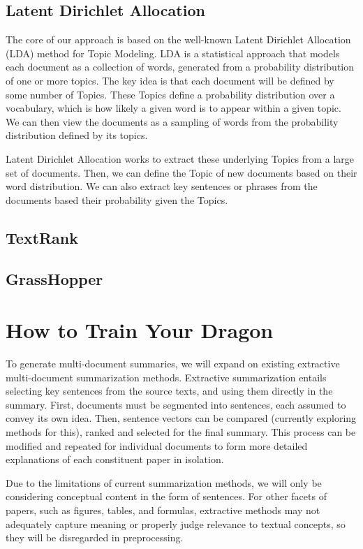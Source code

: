 \documentclass[conference]{sig-alternate-05-2015}
\begin{document}
\subsection{Latent Dirichlet Allocation}
The core of our approach is based on the well-known Latent Dirichlet Allocation (LDA) \cite{lda} method for Topic Modeling.
LDA is a statistical approach that models each document as a collection of words, generated from a probability distribution of one or more topics.
The key idea is that each document will be defined by some number of Topics.
These Topics define a probability distribution over a vocabulary, which is how likely a given word is to appear within a given topic.
We can then view the documents as a sampling of words from the probability distribution defined by its topics. 

Latent Dirichlet Allocation works to extract these underlying Topics from a large set of documents. Then, we can define the Topic of new documents based on their word distribution. We can also extract key sentences or phrases from the documents based their probability given the Topics. 

\subsection{TextRank}

\subsection{GrassHopper}

\section{How to Train Your Dragon}\label{sec:design}

To generate multi-document summaries, we will expand on existing extractive multi-document summarization 
methods. Extractive summarization entails selecting key sentences from the source texts, and using them directly in the 
summary. First, documents must be segmented into sentences, each assumed to convey its own idea. Then, sentence vectors can be 
compared (currently exploring methods for this), ranked and selected for the final summary. This process can be modified 
and repeated for individual documents to form more detailed explanations of each constituent paper in isolation.

Due to the limitations of current summarization methods, we will only be considering 
conceptual content in the form of sentences. For other facets of papers, such as figures, tables, and formulas, extractive 
methods may not adequately capture meaning or properly judge relevance to textual concepts, so they will be 
disregarded in preprocessing.
\end{document}
